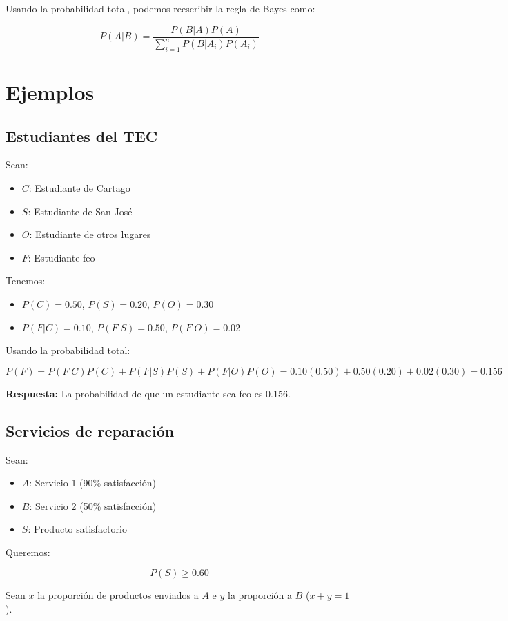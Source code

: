 \documentclass[letterpaper, 12pt]{article}
\begin{document}
	Usando la probabilidad total, podemos reescribir la regla de Bayes como:
	
	\[ P(A|B) = \frac{P(B|A)P(A)}{\sum_{i=1}^{n} P(B|A_i)P(A_i)} \]
	
	\section{Ejemplos}
	
	\subsection{Estudiantes del TEC}
	
	Sean:
	\begin{itemize}
		\item $C$: Estudiante de Cartago
		\item $S$: Estudiante de San José
		\item $O$: Estudiante de otros lugares
		\item $F$: Estudiante feo
	\end{itemize}
	
	Tenemos:
	\begin{itemize}
		\item $P(C) = 0.50$, $P(S) = 0.20$, $P(O) = 0.30$
		\item $P(F|C) = 0.10$, $P(F|S) = 0.50$, $P(F|O) = 0.02$
	\end{itemize}
	
	Usando la probabilidad total:
	
	\[ P(F) = P(F|C)P(C) + P(F|S)P(S) + P(F|O)P(O) = 0.10(0.50) + 0.50(0.20) + 0.02(0.30) = 0.156 \]
	
	\textbf{Respuesta:} La probabilidad de que un estudiante sea feo es 0.156.
	
	\subsection{Servicios de reparación}
	
	Sean:
	\begin{itemize}
		\item $A$: Servicio 1 (90\% satisfacción)
		\item $B$: Servicio 2 (50\% satisfacción)
		\item $S$: Producto satisfactorio
	\end{itemize}
	
	Queremos:
	
	\[ P(S) \geq 0.60 \]
	
	Sean $x$ la proporción de productos enviados a $A$ e $y$ la proporción a $B$ ($x+y=1$).
	
\end{document}
